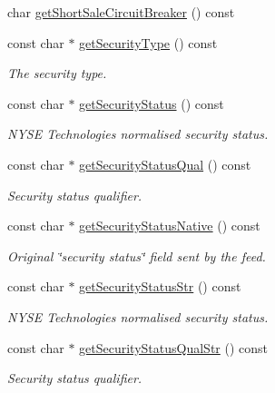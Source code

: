 \begin{CompactItemize}
char \hyperlink{classWombat_1_1MamdaSecStatusListener_4cb86f6d7afb14e8d6411221d8941805}{get\-Short\-Sale\-Circuit\-Breaker} () const 
\item 
const char $\ast$ \hyperlink{classWombat_1_1MamdaSecStatusListener_2f643f3f70d52943af0b2ac011c1fa3b}{get\-Security\-Type} () const 
\begin{CompactList}\small\item\em The security type. \item\end{CompactList}\item 
const char $\ast$ \hyperlink{classWombat_1_1MamdaSecStatusListener_b1b6d523017888af27f4c3745c2e7fc0}{get\-Security\-Status} () const 
\begin{CompactList}\small\item\em NYSE Technologies normalised security status. \item\end{CompactList}\item 
const char $\ast$ \hyperlink{classWombat_1_1MamdaSecStatusListener_c94de1b4d8e9377a219ce488fa7ef16c}{get\-Security\-Status\-Qual} () const 
\begin{CompactList}\small\item\em Security status qualifier. \item\end{CompactList}\item 
const char $\ast$ \hyperlink{classWombat_1_1MamdaSecStatusListener_9f8513907a453b1f2e5b7fad4f6c8b01}{get\-Security\-Status\-Native} () const 
\begin{CompactList}\small\item\em Original \char`\"{}security status\char`\"{} field sent by the feed. \item\end{CompactList}\item 
const char $\ast$ \hyperlink{classWombat_1_1MamdaSecStatusListener_5d6a7b1c018030dbc0a3839bed5bbccb}{get\-Security\-Status\-Str} () const 
\begin{CompactList}\small\item\em NYSE Technologies normalised security status. \item\end{CompactList}\item 
const char $\ast$ \hyperlink{classWombat_1_1MamdaSecStatusListener_4e5aae3d78147807618e44d3bfe96275}{get\-Security\-Status\-Qual\-Str} () const 
\begin{CompactList}\small\item\em Security status qualifier. \item\end{CompactList}\item 

\end{CompactItemize}
